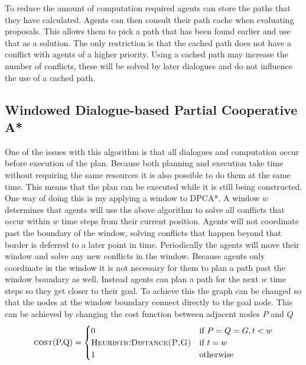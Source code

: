 To reduce the amount of computation required agents can store the paths that
they have calculated. Agents can then consult their path cache when evaluating
proposals. This allows them to pick a path that has been found earlier and use
that as a solution. The only restriction is that the cached path does not have
a conflict with agents of a higher priority. Using a cached path may increase
the number of conflicts, these will be solved by later dialogues and do not
influence the use of a cached path.

\subsection{Windowed Dialogue-based Partial Cooperative A*}
One of the issues with this algorithm is that all dialogues and computation
occur before execution of the plan. Because both planning and execution take
time without requiring the same resources it is also possible to do them at the
same time. This means that the plan can be executed while it is still being
constructed. One way of doing this is my applying a window to DPCA*. A
window $w$ determines that agents will use the above algorithm to solve all
conflicts that occur within $w$ time steps from their current position. Agents
will not coordinate past the boundary of the window, solving conflicts that
happen beyond that border is deferred to a later point in time. Periodically
the agents will move their window and solve any new conflicts in the window.
Because agents only coordinate in the window it is not necessary for them to
plan a path past the window boundary as well. Instead agents can plan a path
for the next $w$ time steps so they get closer to their goal. To achieve this
the graph can be changed so that the nodes at the window boundary connect
directly to the goal node. This can be achieved by changing the cost function
between adjacent nodes $P$ and $Q$ \cite{silver2005}
\[
\text{\textsc{cost}(P,Q)} =
\begin{cases}
    0 & \text{if } P = Q = G, t < w \\
    \textsc{HeuristicDistance(P,G)} & \text{if } t = w \\
    1 & \text{otherwise}
\end{cases}
\]

